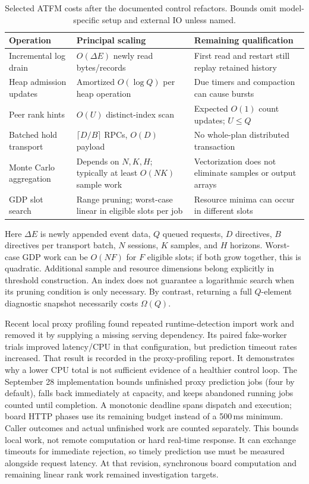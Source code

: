\begin{table}[htbp]\centering\small
\caption{Selected ATFM costs after the documented control refactors. Bounds omit
model-specific setup and external IO unless named.}
\begin{tabularx}{\linewidth}{@{}lXX@{}}\toprule
Operation & Principal scaling & Remaining qualification\\\midrule
Incremental log drain & $O(\Delta E)$ newly read bytes/records & First read and restart still replay retained history\\
Heap admission updates & Amortized $O(\log Q)$ per heap operation & Due timers and compaction can cause bursts\\
Peer rank hints & $O(U)$ distinct-index scan & Expected $O(1)$ count updates; $U \leq Q$\\
Batched hold transport & $\lceil D/B\rceil$ RPCs, $O(D)$ payload & No whole-plan distributed transaction\\
Monte Carlo aggregation & Depends on $N,K,H$; typically at least $O(NK)$ sample work & Vectorization does not eliminate samples or output arrays\\
GDP slot search & Range pruning; worst-case linear in eligible slots per job & Resource minima can occur in different slots\\\bottomrule
\end{tabularx}\end{table}

Here $\Delta E$ is newly appended event data, $Q$ queued requests, $D$ directives,
$B$ directives per transport batch, $N$ sessions, $K$ samples, and $H$ horizons.
Worst-case GDP work can be $O(NF)$ for $F$ eligible slots; if both grow together,
this is quadratic. Additional sample and resource dimensions belong explicitly
in threshold construction. An index does not guarantee a logarithmic search
when its pruning condition is only necessary. By contrast, returning a full
$Q$-element diagnostic snapshot necessarily costs $\Omega(Q)$.

Recent local proxy profiling found repeated runtime-detection import work and
removed it by supplying a missing serving dependency. Its paired fake-worker
trials improved latency/CPU in that configuration, but prediction timeout rates
increased. That result is recorded in the proxy-profiling report. It demonstrates
why a lower CPU total is not sufficient evidence of a healthier control loop.
The September 28 implementation bounds unfinished proxy prediction jobs (four
by default), falls back immediately at capacity, and keeps abandoned running
jobs counted until completion. A monotonic deadline spans dispatch and execution;
board HTTP phases use its remaining budget instead of a 500\,ms minimum.
Caller outcomes and actual unfinished work are counted separately. This bounds
local work, not remote computation or hard real-time response. It can exchange
timeouts for immediate rejection, so timely prediction use must be measured
alongside request latency. At that revision, synchronous board computation and remaining linear
rank work remained investigation targets.


